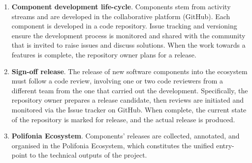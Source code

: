 \begin{enumerate}
    \item \textbf{Component development life-cycle}. Components stem from activity streams and are developed in the collaborative platform (GitHub). Each component is developed in a code repository. Issue tracking and versioning ensure the development process is monitored and shared with the community that is invited to raise issues and discuss solutions. When the work towards a features is complete, the repository owner plans for a release.
    \item \textbf{Sign-off release}. The release of new software components into the ecosystem must follow a code review, involving one or two code reviewers from a different team from the one that carried out the development. Specifically, the repository owner prepares a release candidate, then reviews are initiated and monitored via the Issue tracker on GitHub. When complete, the current state of the repository is marked for release, and the actual release is produced. %
    \item \textbf{Polifonia Ecosystem}. Components' releases are collected, annotated, and organised in the Polifonia Ecosystem, which constitutes the unified entry-point to the technical outputs of the project.
\end{enumerate}


